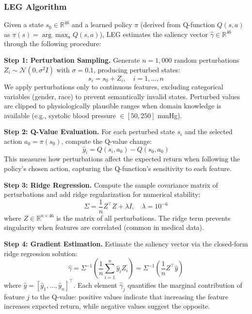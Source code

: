 \subsubsection{LEG Algorithm}

Given a state $s_0 \in \mathbb{R}^{46}$ and a learned policy $\pi$ (derived from Q-function $Q(s,a)$ as $\pi(s) = \arg\max_a Q(s,a)$), LEG estimates the saliency vector $\hat{\gamma} \in \mathbb{R}^{46}$ through the following procedure:

\textbf{Step 1: Perturbation Sampling.} Generate $n = 1{,}000$ random perturbations $Z_i \sim \mathcal{N}(0, \sigma^2 I)$ with $\sigma = 0.1$, producing perturbed states:
\begin{equation}
s_i = s_0 + Z_i, \quad i = 1, \ldots, n
\end{equation}
We apply perturbations only to continuous features, excluding categorical variables (gender, race) to prevent semantically invalid states. Perturbed values are clipped to physiologically plausible ranges when domain knowledge is available (e.g., systolic blood pressure $\in [50, 250]$ mmHg).

\textbf{Step 2: Q-Value Evaluation.} For each perturbed state $s_i$ and the selected action $a_0 = \pi(s_0)$, compute the Q-value change:
\begin{equation}
\hat{y}_i = Q(s_i, a_0) - Q(s_0, a_0)
\end{equation}
This measures how perturbations affect the expected return when following the policy's chosen action, capturing the Q-function's sensitivity to each feature.

\textbf{Step 3: Ridge Regression.} Compute the sample covariance matrix of perturbations and add ridge regularization for numerical stability:
\begin{equation}
\Sigma = \frac{1}{n} Z^\top Z + \lambda I, \quad \lambda = 10^{-6}
\end{equation}
where $Z \in \mathbb{R}^{n \times 46}$ is the matrix of all perturbations. The ridge term prevents singularity when features are correlated (common in medical data).

\textbf{Step 4: Gradient Estimation.} Estimate the saliency vector via the closed-form ridge regression solution:
\begin{equation}
\hat{\gamma} = \Sigma^{-1} \left( \frac{1}{n} \sum_{i=1}^n \hat{y}_i Z_i \right) = \Sigma^{-1} \left( \frac{1}{n} Z^\top \hat{y} \right)
\end{equation}
where $\hat{y} = [\hat{y}_1, \ldots, \hat{y}_n]^\top$. Each element $\hat{\gamma}_j$ quantifies the marginal contribution of feature $j$ to the Q-value: positive values indicate that increasing the feature increases expected return, while negative values suggest the opposite.

